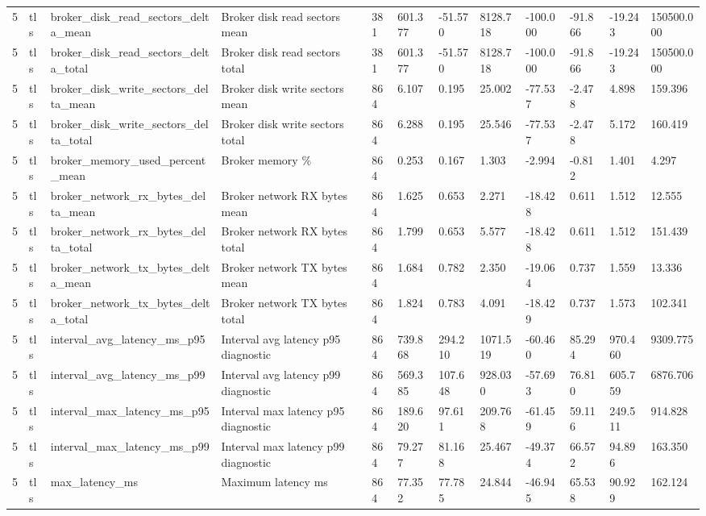 \begin{longtable}{llllllllllll}
5 & tls & broker\_disk\_read\_sectors\_delta\_mean & Broker disk read sectors mean & 381 & 601.377 & -51.570 & 8128.718 & -100.000 & -91.866 & -19.243 & 150500.000 \\
5 & tls & broker\_disk\_read\_sectors\_delta\_total & Broker disk read sectors total & 381 & 601.377 & -51.570 & 8128.718 & -100.000 & -91.866 & -19.243 & 150500.000 \\
5 & tls & broker\_disk\_write\_sectors\_delta\_mean & Broker disk write sectors mean & 864 & 6.107 & 0.195 & 25.002 & -77.537 & -2.478 & 4.898 & 159.396 \\
5 & tls & broker\_disk\_write\_sectors\_delta\_total & Broker disk write sectors total & 864 & 6.288 & 0.195 & 25.546 & -77.537 & -2.478 & 5.172 & 160.419 \\
5 & tls & broker\_memory\_used\_percent\_mean & Broker memory \% & 864 & 0.253 & 0.167 & 1.303 & -2.994 & -0.812 & 1.401 & 4.297 \\
5 & tls & broker\_network\_rx\_bytes\_delta\_mean & Broker network RX bytes mean & 864 & 1.625 & 0.653 & 2.271 & -18.428 & 0.611 & 1.512 & 12.555 \\
5 & tls & broker\_network\_rx\_bytes\_delta\_total & Broker network RX bytes total & 864 & 1.799 & 0.653 & 5.577 & -18.428 & 0.611 & 1.512 & 151.439 \\
5 & tls & broker\_network\_tx\_bytes\_delta\_mean & Broker network TX bytes mean & 864 & 1.684 & 0.782 & 2.350 & -19.064 & 0.737 & 1.559 & 13.336 \\
5 & tls & broker\_network\_tx\_bytes\_delta\_total & Broker network TX bytes total & 864 & 1.824 & 0.783 & 4.091 & -18.429 & 0.737 & 1.573 & 102.341 \\
5 & tls & interval\_avg\_latency\_ms\_p95 & Interval avg latency p95 diagnostic & 864 & 739.868 & 294.210 & 1071.519 & -60.460 & 85.294 & 970.460 & 9309.775 \\
5 & tls & interval\_avg\_latency\_ms\_p99 & Interval avg latency p99 diagnostic & 864 & 569.385 & 107.648 & 928.030 & -57.693 & 76.810 & 605.759 & 6876.706 \\
5 & tls & interval\_max\_latency\_ms\_p95 & Interval max latency p95 diagnostic & 864 & 189.620 & 97.611 & 209.768 & -61.459 & 59.116 & 249.511 & 914.828 \\
5 & tls & interval\_max\_latency\_ms\_p99 & Interval max latency p99 diagnostic & 864 & 79.277 & 81.168 & 25.467 & -49.374 & 66.572 & 94.896 & 163.350 \\
5 & tls & max\_latency\_ms & Maximum latency ms & 864 & 77.352 & 77.785 & 24.844 & -46.945 & 65.538 & 90.929 & 162.124 \\

\end{longtable}
